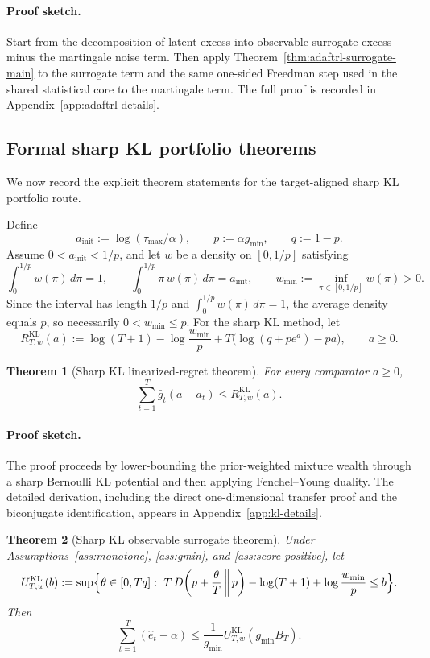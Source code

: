 \documentclass[11pt]{article}
\newtheorem{theorem}{Theorem}
\newcommand{\1}{\mathbf{1}}
\begin{document}
\paragraph{Proof sketch.}
Start from the decomposition of latent excess into observable surrogate excess minus the martingale noise term. Then apply Theorem~\ref{thm:adaftrl-surrogate-main} to the surrogate term and the same one-sided Freedman step used in the shared statistical core to the martingale term. The full proof is recorded in Appendix~\ref{app:adaftrl-details}.

\subsection{Formal sharp KL portfolio theorems}

We now record the explicit theorem statements for the target-aligned sharp KL portfolio route.

Define
\[
a_{\mathrm{init}}:=\log(\tau_{\max}/\alpha),
\qquad
p:=\alpha g_{\min},
\qquad
q:=1-p.
\]
Assume \(0<a_{\mathrm{init}}<1/p\), and let \(w\) be a density on \([0,1/p]\) satisfying
\[
\int_0^{1/p} w(\pi)\,d\pi=1,
\qquad
\int_0^{1/p}\pi\,w(\pi)\,d\pi=a_{\mathrm{init}},
\qquad
w_{\min}:=\inf_{\pi\in[0,1/p]}w(\pi)>0.
\]
Since the interval has length \(1/p\) and \(\int_0^{1/p} w(\pi)\,d\pi=1\), the average density equals \(p\), so necessarily \(0<w_{\min}\le p\).
For the sharp KL method, let
\[
R_{T,w}^{\mathrm{KL}}(a)
:=
\log(T+1)-\log\frac{w_{\min}}{p}
+
T\bigl(\log(q+pe^a)-pa\bigr),
\qquad a\ge 0.
\]

\begin{theorem}[Sharp KL linearized-regret theorem]
\label{thm:kl-regret-main}
For every comparator \(a\ge 0\),
\[
\sum_{t=1}^T \bar g_t(a-a_t)
\le
R_{T,w}^{\mathrm{KL}}(a).
\]
\end{theorem}

\paragraph{Proof sketch.}
The proof proceeds by lower-bounding the prior-weighted mixture wealth through a sharp Bernoulli KL potential and then applying Fenchel--Young duality. The detailed derivation, including the direct one-dimensional transfer proof and the biconjugate identification, appears in Appendix~\ref{app:kl-details}.

\begin{theorem}[Sharp KL observable surrogate theorem]
\label{thm:kl-observable-main}
Under Assumptions~\ref{ass:monotone}, \ref{ass:gmin}, and \ref{ass:score-positive}, let
\[
U_{T,w}^{\mathrm{KL}}(b)
:=
\sup\Bigl\{
\theta\in[0,Tq]:
\ T\,D\!\left(p+\frac{\theta}{T}\,\middle\|\,p\right)-\log(T+1)+\log\frac{w_{\min}}{p}\le b
\Bigr\}.
\]
Then
\[
\sum_{t=1}^T(\hat e_t-\alpha)
\le
\frac{1}{g_{\min}}U_{T,w}^{\mathrm{KL}}(g_{\min}B_T).
\]
\end{theorem}
\end{document}
